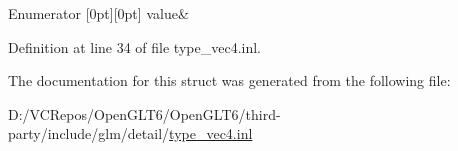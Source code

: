 \begin{DoxyEnumFields}{Enumerator}
[0pt][0pt]{}\mbox{\label{structglm_1_1detail_1_1is__int_3_01int64_01_4_a6d738b326fc92804b0cffae571ac3e7fa143df02d7060f75928a631355c601c08}} 
value&\\
\hline

\end{DoxyEnumFields}


Definition at line 34 of file type\+\_\+vec4.\+inl.



The documentation for this struct was generated from the following file\+:\begin{DoxyCompactItemize}
\item 
D\+:/\+V\+C\+Repos/\+Open\+G\+L\+T6/\+Open\+G\+L\+T6/third-\/party/include/glm/detail/\mbox{\hyperlink{type__vec4_8inl}{type\+\_\+vec4.\+inl}}\end{DoxyCompactItemize}
